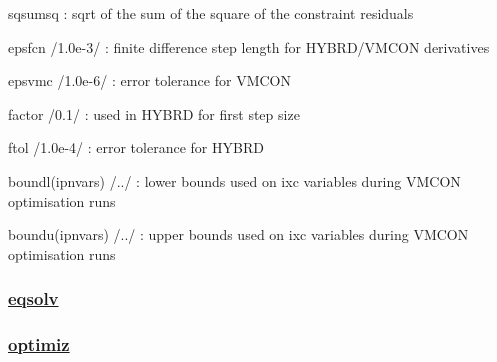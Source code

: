 \documentclass[]{article}
\begin{document}
sqsumsq : sqrt of the sum of the square of the constraint residuals

epsfcn /1.0e-3/ : finite difference step length for HYBRD/VMCON
derivatives

epsvmc /1.0e-6/ : error tolerance for VMCON

factor /0.1/ : used in HYBRD for first step size

ftol /1.0e-4/ : error tolerance for HYBRD

boundl(ipnvars) /../ : lower bounds used on ixc variables during VMCON
optimisation runs

boundu(ipnvars) /../ : upper bounds used on ixc variables during VMCON
optimisation runs

\subsubsection{\href{eqsolv.html}{eqsolv}}

\subsubsection{\href{optimiz.html}{optimiz}}
\end{document}
